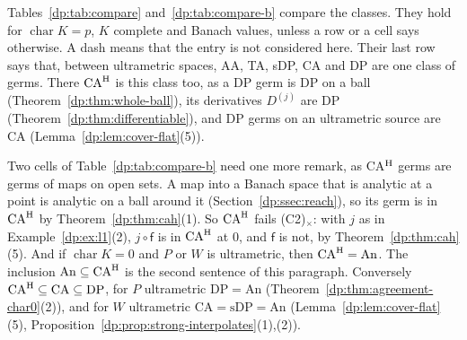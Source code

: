 \documentclass[11pt]{amsart}
\theoremstyle{definition}
\theoremstyle{remark}
\numberwithin{equation}{section}
\theoremstyle{plain}
\theoremstyle{definition}
\theoremstyle{plain}
\begin{document}
Tables~\ref{dp:tab:compare} and~\ref{dp:tab:compare-b} compare the classes. They hold for $\operatorname{char}K=p$, $K$ complete and Banach values, unless a row or a cell says otherwise. A dash means that the entry is not considered here. Their last row says that, between ultrametric spaces, AA, TA, sDP, CA and DP are one class of germs. There $\mathrm{CA}^{\rm H}$ is this class too, as a DP germ is DP on a ball (Theorem~\ref{dp:thm:whole-ball}), its derivatives $D^{(j)}$ are DP (Theorem~\ref{dp:thm:differentiable}), and DP germs on an ultrametric source are CA (Lemma~\ref{dp:lem:cover-flat}(5)).

Two cells of Table~\ref{dp:tab:compare-b} need one more remark, as CA$^{\rm H}$ germs are germs of maps on open sets. A map into a Banach space that is analytic at a point is analytic on a ball around it (Section~\ref{dp:ssec:reach}), so its germ is in $\mathrm{CA}^{\rm H}$ by Theorem~\ref{dp:thm:cah}(1). So $\mathrm{CA}^{\rm H}$ fails (C2)$_\times$: with $j$ as in Example~\ref{dp:ex:l1}(2), $j\circ\mathsf f$ is in $\mathrm{CA}^{\rm H}$ at $0$, and $\mathsf f$ is not, by Theorem~\ref{dp:thm:cah}(5). And if $\operatorname{char}K=0$ and $P$ or $W$ is ultrametric, then $\mathrm{CA}^{\rm H}=\mathrm{An}$. The inclusion $\mathrm{An}\subseteq\mathrm{CA}^{\rm H}$ is the second sentence of this paragraph. Conversely $\mathrm{CA}^{\rm H}\subseteq\mathrm{CA}\subseteq\mathrm{DP}$, for $P$ ultrametric $\mathrm{DP}=\mathrm{An}$ (Theorem~\ref{dp:thm:agreement-char0}(2)), and for $W$ ultrametric $\mathrm{CA}=\mathrm{sDP}=\mathrm{An}$ (Lemma~\ref{dp:lem:cover-flat}(5), Proposition~\ref{dp:prop:strong-interpolates}(1),(2)).
\end{document}
